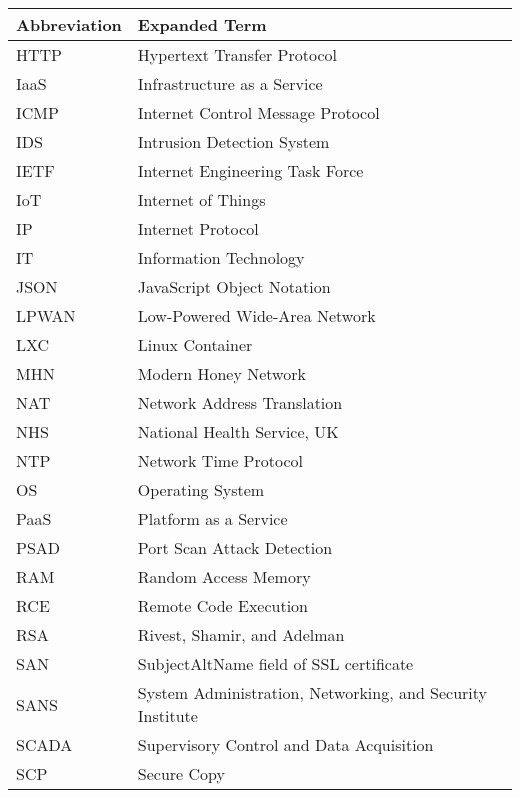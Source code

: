 \begin{tabular}{p{40mm}|p{100mm}}
	\textbf{Abbreviation}&\textbf{Expanded Term}\\
	\hline
    HTTP&Hypertext Transfer Protocol\\
    IaaS&Infrastructure as a Service\\
    ICMP&Internet Control Message Protocol\\
    IDS&Intrusion Detection System\\
    IETF&Internet Engineering Task Force\\
    IoT&Internet of Things\\
    IP&Internet Protocol\\
    IT&Information Technology\\
    JSON&JavaScript Object Notation\\
    LPWAN&Low-Powered Wide-Area Network\\
    LXC&Linux Container\\
    MHN&Modern Honey Network\\
    NAT&Network Address Translation\\%
    NHS&National Health Service, UK\\
    NTP&Network Time Protocol\\
    OS&Operating System\\
    PaaS&Platform as a Service\\
    PSAD&Port Scan Attack Detection\\
    RAM&Random Access Memory\\
    RCE&Remote Code Execution\\
    RSA&Rivest, Shamir, and Adelman\\
    SAN&SubjectAltName field of SSL certificate\\
    SANS&System Administration, Networking, and Security Institute\\
    SCADA&Supervisory Control and Data Acquisition\\ 
    SCP&Secure Copy\\

    \end{tabular} 

